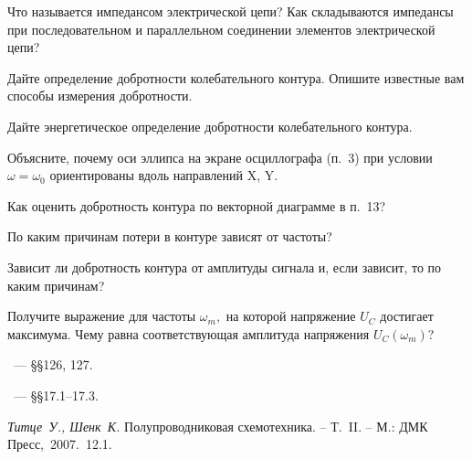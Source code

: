 \begin{lab:questions}
    \item Что называется импедансом электрической цепи?
    Как складываются импедансы при последовательном и параллельном
    соединении элементов электрической цепи?
    
     \item Дайте определение добротности колебательного контура.
     Опишите известные вам способы измерения добротности.
     
	\item Дайте энергетическое определение добротности колебательного контура.

	\item Объясните, почему оси эллипса на экране осциллографа (п.~3) при
условии $\omega=\omega_0$ ориентированы вдоль направлений X, Y.

	\item Как оценить добротность контура по векторной диаграмме в п.~13?

	\item По каким причинам потери в контуре зависят от частоты?

	\item Зависит ли добротность контура от амплитуды сигнала и, если зависит,
то по каким причинам?

	\item Получите выражение для частоты $\omega_m,$ на которой напряжение $U_C$
достигает максимума. Чему равна соответствующая амплитуда напряжения $U_C(\omega_m)$?
\end{lab:questions}


\begin{lab:literature}
    \item \SivuhinIII~--- \S\S126, 127.
    \item \Kirichenko~--- \S\S17.1--17.3.
	\item \textit{Титце~У., Шенк~К.} Полупроводниковая схемотехника.  – Т.~II. –
М.: ДМК Пресс,~2007.~12.1.
\end{lab:literature}
